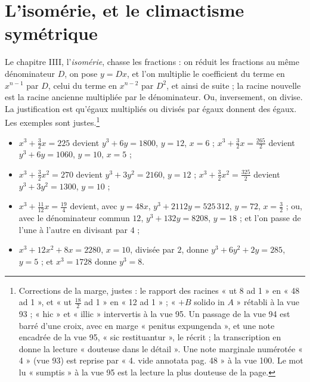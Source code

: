 \documentclass[11pt,a4paper]{article}
\begin{document}
\section*{L'isomérie, et le climactisme symétrique}

Le chapitre IIII, l'\emph{isomérie}, chasse les fractions : on réduit les
fractions au même dénominateur $D$, on pose $y = Dx$, et l'on multiplie le
coefficient du terme en $x^{n-1}$ par $D$, celui du terme en $x^{n-2}$ par $D^2$,
et ainsi de suite ; la racine nouvelle est la racine ancienne multipliée par le
dénominateur. Ou, inversement, on divise. La justification est qu'égaux
multipliés ou divisés par égaux donnent des égaux. Les exemples sont
justes.\footnote{Corrections de la marge, justes : le rapport des racines « ut 8 ad 1 »
en « 48 ad 1 », et « ut $\frac{18}{2}$ ad 1 » en « 12 ad 1 » ; « $+ B$ solido in $A$ »
rétabli à la vue 93 ; « hic » et « illic » intervertis à la vue 95. Un passage de
la vue 94 est barré d'une croix, avec en marge « penitus expungenda », et une
note encadrée de la vue 95, « sic restituantur », le récrit ; la transcription
en donne la lecture « douteuse dans le détail ». Une note marginale numérotée
« 4 » (vue 93) est reprise par « 4. vide annotata pag. 48 » à la vue 100. Le mot
lu « sumptis » à la vue 95 est la lecture la plus douteuse de la page.}
\begin{itemize}
  \item $x^3 + \tfrac32 x = 225$ devient $y^3 + 6y = 1800$, $y = 12$, $x = 6$ ;
    $x^3 + \tfrac32 x = \tfrac{265}{2}$ devient $y^3 + 6y = 1060$, $y = 10$,
    $x = 5$ ;
  \item $x^3 + \tfrac32 x^2 = 270$ devient $y^3 + 3y^2 = 2160$, $y = 12$ ;
    $x^3 + \tfrac32 x^2 = \tfrac{325}{2}$ devient $y^3 + 3y^2 = 1300$, $y = 10$ ;
  \item $x^3 + \tfrac{11}{12}x = \tfrac{19}{4}$ devient, avec $y = 48x$,
    $y^3 + 2112y = 525\,312$, $y = 72$, $x = \tfrac32$ ; ou, avec le dénominateur
    commun $12$, $y^3 + 132y = 8208$, $y = 18$ ; et l'on passe de l'une à l'autre
    en divisant par $4$ ;
  \item $x^3 + 12x^2 + 8x = 2280$, $x = 10$, divisée par $2$, donne
    $y^3 + 6y^2 + 2y = 285$, $y = 5$ ; et $x^3 = 1728$ donne $y^3 = 8$.
\end{itemize}
\end{document}
